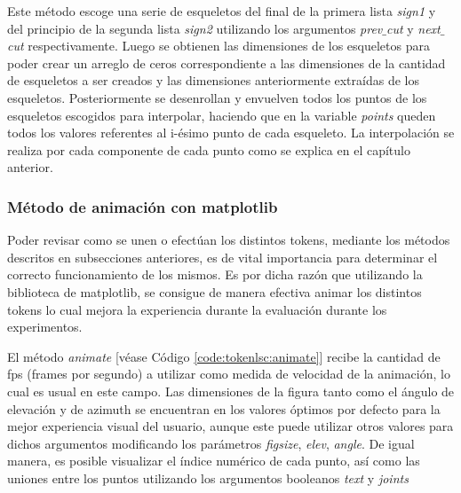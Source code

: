 Este método escoge una serie de esqueletos del final de la primera lista \textit{sign1} y del principio de la segunda lista \textit{sign2} utilizando los argumentos \textit{prev$\_$cut} y \textit{next$\_$cut} respectivamente. Luego se obtienen las dimensiones de los esqueletos para poder crear un arreglo de ceros correspondiente a las dimensiones de la cantidad de esqueletos a ser creados y las dimensiones anteriormente extraídas de los esqueletos. Posteriormente se desenrollan y envuelven todos los puntos de los esqueletos escogidos para interpolar, haciendo que en la variable \textit{points} queden todos los valores referentes al i-ésimo punto de cada esqueleto. La interpolación se realiza por cada componente de cada punto como se explica en el capítulo anterior. 

\subsubsection{Método de animación con matplotlib}
Poder revisar como se unen o efectúan los distintos tokens, mediante los métodos descritos en subsecciones anteriores, es de vital importancia para determinar el correcto funcionamiento de los mismos. Es por dicha razón que utilizando la biblioteca de matplotlib, se consigue de manera efectiva animar los distintos tokens lo cual mejora la experiencia durante la evaluación durante los experimentos.

El método \textit{animate} [véase Código \ref{code:tokenlsc:animate}] recibe la cantidad de fps (frames por segundo) a utilizar como medida de velocidad de la animación, lo cual es usual en este campo. Las dimensiones de la figura tanto como el ángulo de elevación y de azimuth se encuentran en los valores óptimos por defecto para la mejor experiencia visual del usuario, aunque este puede utilizar otros valores para dichos argumentos modificando los parámetros \textit{figsize}, \textit{elev}, \textit{angle}. De igual manera, es posible visualizar el índice numérico de cada punto, así como las uniones entre los puntos utilizando los argumentos booleanos \textit{text} y \textit{joints}

